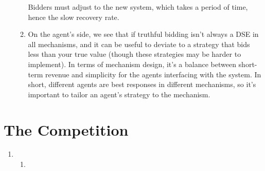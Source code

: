 \documentclass[11pt]{article}
\begin{document}
\begin{enumerate}[resume]
\begin{enumerate}
  Bidders must adjust to the new system, which takes a period of time, hence the slow recovery rate.
  \item On the agent's side, we see that if truthful bidding isn't always a DSE in all mechanisms, and it can be useful to deviate to a strategy that bids less than your true value (though these strategies may be harder to implement). In terms of mechanism design, it's a balance between short-term revenue and simplicity for the agents interfacing with the system. In short, different agents are best responses in different mechanisms, so it's important to tailor an agent's strategy to the mechanism.
  \end{enumerate}
\end{enumerate}

\section*{The Competition}
\begin{enumerate}[resume]
\item
  \begin{enumerate}
  \item 
  \end{enumerate}
\end{enumerate}
\end{document}
